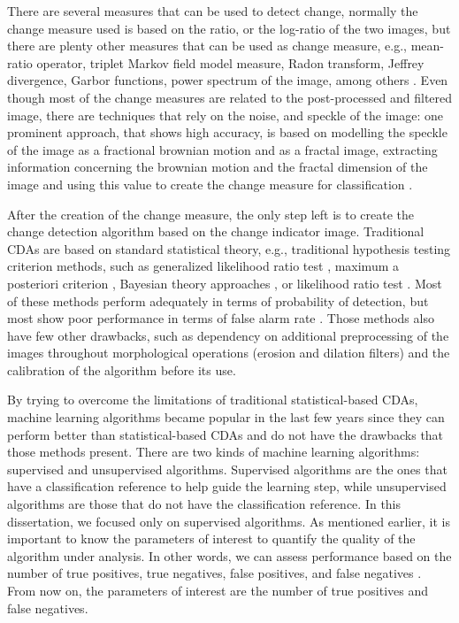 There are several measures that can be used to detect change, normally the change measure used is based on the ratio, or the log-ratio of the two images\cite{change6}, but there are plenty other measures that can be used as change measure, e.g., mean-ratio operator, triplet Markov field model measure, Radon transform, Jeffrey divergence, Garbor functions, power spectrum of the image, among others \cite{change5, change6, change7}. Even though most of the change measures are related to the post-processed and filtered image, there are techniques that rely on the noise, and speckle of the image: one prominent approach, that shows high accuracy, is based on modelling the speckle of the image as a fractional brownian motion and as a fractal image, extracting information concerning the brownian motion and the fractal dimension of the image and using this value to create the change measure for classification \cite{change5}. 

After the creation of the change measure, the only step left is to create the change detection algorithm based on the change indicator image. Traditional CDAs are based on standard statistical theory, e.g., traditional hypothesis testing criterion methods, such as generalized likelihood ratio test \cite{GLRT1,GLRT2,GLRT3}, 
maximum a posteriori criterion \cite{Book_Kay},
Bayesian theory approaches \cite{Bayes1, Bayes2},
or likelihood ratio test \cite{LRT1,LRT2,LRT3}. Most of these methods perform adequately in terms of probability of detection, but most show poor performance in terms of false alarm rate \cite{Carabas,Ricardo,LucasRamos,Chris}. Those methods also have few other drawbacks, such as dependency on additional preprocessing of the images throughout morphological operations (erosion and dilation filters) and the calibration of the algorithm before its use.

By trying to overcome the limitations of traditional statistical-based CDAs, machine learning algorithms became popular in the last few years \cite{Vinholi, Campos} since they can perform better than statistical-based CDAs and do not have the drawbacks that those methods present. There are two kinds of machine learning algorithms: supervised and unsupervised algorithms. Supervised algorithms are the ones that have a classification reference to help guide the learning step, while unsupervised algorithms are those that do not have the classification reference. In this dissertation, we focused only on supervised algorithms. As mentioned earlier, it is important to know the parameters of interest to quantify the quality of the algorithm under analysis. In other words, we can assess performance based on the number of true positives, true negatives, false positives, and false negatives \cite{PefMe}. From now on, the parameters of interest are the number of true positives and false negatives.

